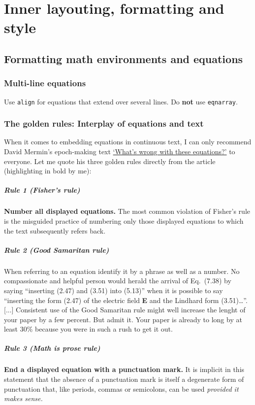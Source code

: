 \chapter{Inner layouting, formatting and style}
\section{Formatting math environments and equations}

\subsection{Multi-line equations}
Use \verb|align| for equations that extend over several lines. Do \textbf{not} use \verb|eqnarray|.

\subsection{The golden rules: Interplay of equations and text}
When it comes to embedding equations in continuous text, I can only recommend David Mermin's epoch-making text \href{https://wp.optics.arizona.edu/kupinski/wp-content/uploads/sites/91/2023/05/MerminEquations.pdf}{`What's wrong with these equations?'}\cite{mermin1989} to everyone. Let me quote his three golden rules directly from the article (highlighting in bold by me):
\paragraph{Rule 1 (Fisher's rule)} \textbf{Number all displayed equations.} The most common violation of Fisher's rule is the misguided practice of numbering only those displayed equations to which the text subsequently refers back.
\paragraph{Rule 2 (Good Samaritan rule)} When referring to an equation identify it by a phrase as well as a number. No compassionate and helpful person would herald the arrival of Eq.~(7.38) by saying ``inserting (2.47) and (3.51) into (5.13)'' when it is possible to say ``inserting the form (2.47) of the electric field \textbf{E} and the Lindhard form (3.51)\dots''. [...] Consistent use of the Good Samaritan rule might well increase the lenght of your paper by a few percent. But admit it. Your paper is already to long by at least 30\% because you were in such a rush to get it out.
\paragraph{Rule 3 (Math is prose rule)} \textbf{End a displayed equation with a punctuation mark.} It is implicit in this statement that the absence of a punctuation mark is itself a degenerate form of punctuation that, like periods, commas or semicolons, can be used \emph{provided it makes sense.}

